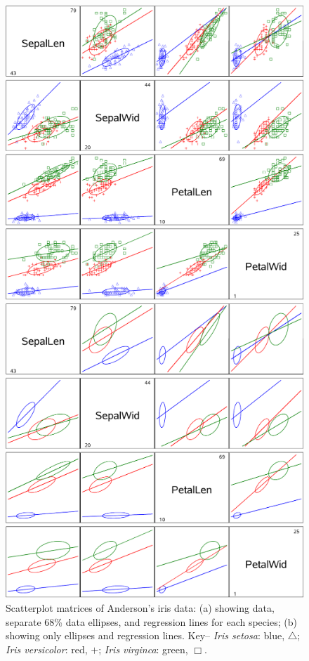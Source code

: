 \documentclass[11pt]{article}%
\begin{document}
\begin{figure}[htb]
  \begin{minipage}[c]{.485\textwidth}
   \includegraphics[width=1\linewidth,clip]{fig/scatirisd1}
   \end{minipage}%
  \hfill
  \begin{minipage}[c]{.485\textwidth}
   \includegraphics[width=1\linewidth,clip]{fig/scatirisd3}
  \end{minipage}
  \caption{Scatterplot matrices of Anderson's iris data: (a) showing data, separate 68\% data
  ellipses, and regression lines for each species; (b) showing only ellipses and regression lines.
  Key-- \emph{Iris setosa}: blue, $\triangle$; \emph{Iris versicolor}: red, $+$;
  \emph{Iris virginca}: green, $\Box$.}%
  \label{fig:scatirisd1}
\end{figure}
\end{document}
